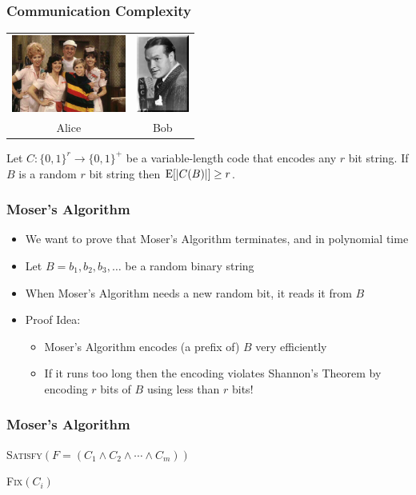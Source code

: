 \documentclass{beamer}
\begin{document}
\frame
{
  \frametitle{Communication Complexity}
 
  \begin{center} 
    \begin{tabular}{cc}
      \includegraphics[height=1in]{alice3} 
         & \includegraphics[height=1in]{bob-hope} \\
      Alice & Bob 
    \end{tabular}
  \begin{thm}[Shannon 1953]
    Let $C:\{0,1\}^r\rightarrow \{0,1\}^+$ be a variable-length code
    that encodes any $r$ bit string. If $B$ is a random $r$ bit string
    then $\mathrm{E}[|C(B)|] \ge r$.
  \end{thm}
  \end{center}
}

\frame
{
  \frametitle{Moser's Algorithm}
  \begin{itemize}
    \item We want to prove that Moser's Algorithm terminates, and in
polynomial time
    \item Let $B=b_1,b_2,b_3,\ldots$ be a random binary string
    \item When Moser's Algorithm needs a new random bit, it reads it from $B$
    \item Proof Idea:
    \begin{itemize}
      \item Moser's Algorithm encodes (a prefix of) $B$ very efficiently
      \item If it runs too long then the encoding violates Shannon's Theorem
        by encoding $r$ bits of $B$ using less than $r$ bits!
    \end{itemize}
  \end{itemize}
}

\frame
{
  \frametitle{Moser's Algorithm}

  \noindent\textsc{Satisfy$(F=(C_1\wedge C_2\wedge\cdots\wedge C_m))$}
  \begin{algorithmic}
     \ENDIF
   \ENDFOR
  \end{algorithmic}
  \vspace{1ex}
  \noindent\textsc{Fix$(C_i)$}
  \begin{algorithmic}
     \ENDIF
   \ENDFOR
  \end{algorithmic}
}
\end{document}
